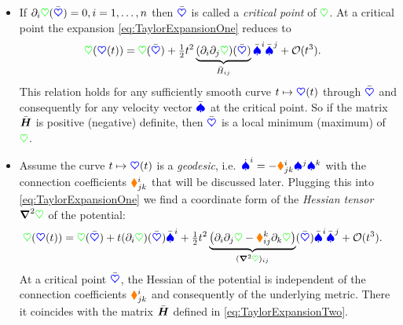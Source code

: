 \begin{itemize}
 \item 
If $\partial_{i} \textcolor{green}{\heartsuit}(\bar{\boldsymbol{\textcolor{blue}{\heartsuit}}}) = 0, i=1,\ldots,n$ then $\bar{\boldsymbol{\textcolor{blue}{\heartsuit}}}$ is called a \textit{critical point} of $\textcolor{green}{\heartsuit}$.
At a critical point the expansion \eqref{eq:TaylorExpansionOne} reduces to
\begin{align}
 \textcolor{green}{\heartsuit}(\boldsymbol{\textcolor{blue}{\heartsuit}}(t))
 &= \textcolor{green}{\heartsuit}(\bar{\boldsymbol{\textcolor{blue}{\heartsuit}}})
  + \tfrac{1}{2} t^2 \underbrace{(\partial_{i} \partial_{j} \textcolor{green}{\heartsuit})(\bar{\boldsymbol{\textcolor{blue}{\heartsuit}}})}_{\bar{H}_{ij}} \bar{\textcolor{blue}{\spadesuit}}^{i} \bar{\textcolor{blue}{\spadesuit}}^{j}
  + \mathcal{O}(t^3).
\label{eq:TaylorExpansionTwo}
\end{align}
This relation holds for any sufficiently smooth curve $t\mapsto\boldsymbol{\textcolor{blue}{\heartsuit}}(t)$ through $\bar{\boldsymbol{\textcolor{blue}{\heartsuit}}}$ and consequently for any velocity vector $\bar{\boldsymbol{\textcolor{blue}{\spadesuit}}}$ at the critical point.
So if the matrix $\bar{\boldsymbol{H}}$ is positive (negative) definite, then $\bar{\boldsymbol{\textcolor{blue}{\heartsuit}}}$ is a local minimum (maximum) of $\textcolor{green}{\heartsuit}$.

\item
Assume the curve $t\mapsto\boldsymbol{\textcolor{blue}{\heartsuit}}(t)$ is a \textit{geodesic}, i.e.\ $\dot{\textcolor{blue}{\spadesuit}}^{i} = -\textcolor{orange}{\blacklozenge}^{i}_{jk} \textcolor{blue}{\spadesuit}^{j} \textcolor{blue}{\spadesuit}^{k}$ with the connection coefficients $\textcolor{orange}{\blacklozenge}^{i}_{jk}$ that will be discussed later.
Plugging this into \eqref{eq:TaylorExpansionOne} we find a coordinate form of the \textit{Hessian tensor} $\boldsymbol{\nabla}^2 \textcolor{green}{\heartsuit}$ of the potential:
\begin{align}
 \textcolor{green}{\heartsuit}(\boldsymbol{\textcolor{blue}{\heartsuit}}(t))
 &= \textcolor{green}{\heartsuit}(\bar{\boldsymbol{\textcolor{blue}{\heartsuit}}})
  + t (\partial_{i} \textcolor{green}{\heartsuit})(\bar{\boldsymbol{\textcolor{blue}{\heartsuit}}}) \bar{\textcolor{blue}{\spadesuit}}^{i}
  + \tfrac{1}{2} t^2 \underbrace{\big( \partial_{i} \partial_{j} \textcolor{green}{\heartsuit} - \textcolor{orange}{\blacklozenge}^{k}_{ij} \partial_{k} \textcolor{green}{\heartsuit} \big)}_{(\boldsymbol{\nabla}^2\textcolor{green}{\heartsuit})_{ij}}(\bar{\boldsymbol{\textcolor{blue}{\heartsuit}}})  \bar{\textcolor{blue}{\spadesuit}}^{i} \bar{\textcolor{blue}{\spadesuit}}^{j}
  + \mathcal{O}(t^3).
\end{align}
At a critical point $\bar{\boldsymbol{\textcolor{blue}{\heartsuit}}}$, the Hessian of the potential is independent of the connection coefficients $\textcolor{orange}{\blacklozenge}^{i}_{jk}$ and consequently of the underlying metric.
There it coincides with the matrix $\bar{\boldsymbol{H}}$ defined in \eqref{eq:TaylorExpansionTwo}.
\end{itemize}


